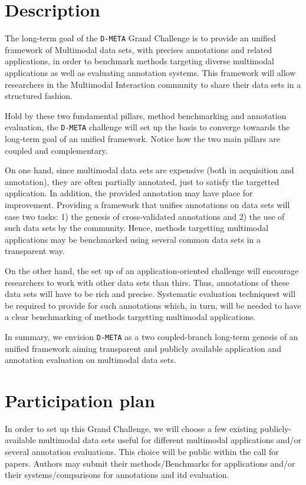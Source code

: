 \documentclass{sig-alternate}
\begin{document}
\section{Description}
The long-term goal of the \texttt{D-META} Grand Challenge is to provide an unified framework of Multimodal data sets,
with precises annotations and related applications, in order to benchmark methods targeting diverse multimodal
applications as well as evaluating annotation systems. This framework will allow researchers in the Multimodal
Interaction community to share their data sets in a structured fashion.\vspace{0.3cm}

Hold by these two fundamental pillars, method benchmarking and annotation evaluation, the \texttt{D-META} challenge
will set up the basis to converge towaards the long-term goal of an unified framework. Notice how the two main pillars
are coupled and complementary.\vspace{0.3cm}

On one hand, since multimodal data sets are expensive (both in acquisition and annotation), they are often partially
annotated, just to satisfy the targetted application. In addition, the provided annotation may have place for
improvement. Providing a framework that unifies annotations on data sets will ease two tasks: 1) the genesis of
cross-validated annotations and 2) the use of such data sets by the community. Hence, methods targetting multimodal
applications may be benchmarked using several common data sets in a transparent way.\vspace{0.3cm}

On the other hand, the set up of an application-oriented challenge will encourage researchers to work with other data
sets than thirs. Thus, annotations of these data sets will have to be rich and precise. Systematic evaluation
techniquest will be required to provide for such annotations which, in turn, will be needed to have a clear
benchmarking of methods targetting multimodal applications.\vspace{0.3cm}

In summary, we envision \texttt{D-META} as a two coupled-branch long-term genesis of an unified framework aiming
transparent and publicly available application and annotation evaluation on multimodal data sets.

\section{Participation plan}
In order to set up this Grand Challenge, we will choose a few existing publicly-available multimodal data sets useful
for different multimodal applications and/or several annotation evaluations. This choice will be public within the call
for papers. Authors may submit their methods/Benchmarks for applications and/or their systems/comparisons for
annotations and itd evaluation.\vspace{0.3cm}
\end{document}
